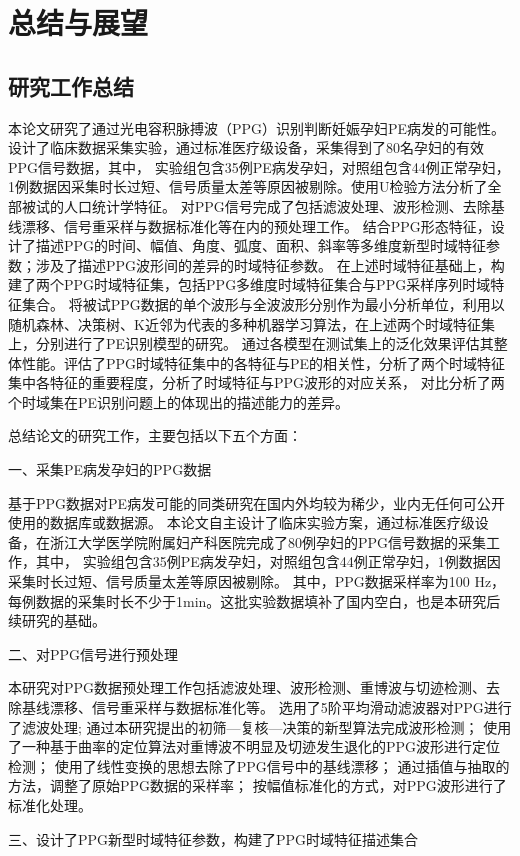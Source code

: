 \chapter{总结与展望}
\section{研究工作总结}
本论文研究了通过光电容积脉搏波（PPG）识别判断妊娠孕妇PE病发的可能性。设计了临床数据采集实验，通过标准医疗级设备，采集得到了80名孕妇的有效PPG信号数据，其中，
实验组包含35例PE病发孕妇，对照组包含44例正常孕妇，1例数据因采集时长过短、信号质量太差等原因被剔除。使用U检验方法分析了全部被试的人口统计学特征。
对PPG信号完成了包括滤波处理、波形检测、去除基线漂移、信号重采样与数据标准化等在内的预处理工作。
结合PPG形态特征，设计了描述PPG的时间、幅值、角度、弧度、面积、斜率等多维度新型时域特征参数；涉及了描述PPG波形间的差异的时域特征参数。
在上述时域特征基础上，构建了两个PPG时域特征集，包括PPG多维度时域特征集合与PPG采样序列时域特征集合。
将被试PPG数据的单个波形与全波波形分别作为最小分析单位，利用以随机森林、决策树、K近邻为代表的多种机器学习算法，在上述两个时域特征集上，分别进行了PE识别模型的研究。
通过各模型在测试集上的泛化效果评估其整体性能。评估了PPG时域特征集中的各特征与PE的相关性，分析了两个时域特征集中各特征的重要程度，分析了时域特征与PPG波形的对应关系，
对比分析了两个时域集在PE识别问题上的体现出的描述能力的差异。

总结论文的研究工作，主要包括以下五个方面：

一、采集PE病发孕妇的PPG数据

基于PPG数据对PE病发可能的同类研究在国内外均较为稀少，业内无任何可公开使用的数据库或数据源。
本论文自主设计了临床实验方案，通过标准医疗级设备，在浙江大学医学院附属妇产科医院完成了80例孕妇的PPG信号数据的采集工作，其中，
实验组包含35例PE病发孕妇，对照组包含44例正常孕妇，1例数据因采集时长过短、信号质量太差等原因被剔除。
其中，PPG数据采样率为100 Hz，每例数据的采集时长不少于1min。这批实验数据填补了国内空白，也是本研究后续研究的基础。

二、对PPG信号进行预处理

本研究对PPG数据预处理工作包括滤波处理、波形检测、重博波与切迹检测、去除基线漂移、信号重采样与数据标准化等。
选用了5阶平均滑动滤波器对PPG进行了滤波处理;
通过本研究提出的初筛—复核—决策的新型算法完成波形检测；
使用了一种基于曲率的定位算法对重博波不明显及切迹发生退化的PPG波形进行定位检测；
使用了线性变换的思想去除了PPG信号中的基线漂移；
通过插值与抽取的方法，调整了原始PPG数据的采样率；
按幅值标准化的方式，对PPG波形进行了标准化处理。

三、设计了PPG新型时域特征参数，构建了PPG时域特征描述集合

